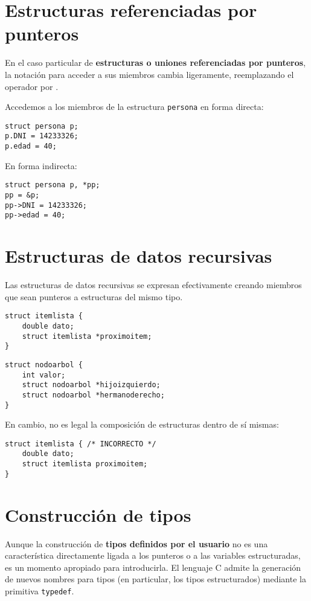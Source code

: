 \section{Estructuras referenciadas por punteros}
En el caso particular de \textbf{estructuras o uniones referenciadas por punteros}, la
notación para acceder a sus miembros cambia ligeramente, reemplazando el
operador  por \quotes{\lstinline{->}}.
\begin{ejemplo}
Accedemos a los miembros de la estructura \lstinline{persona} en forma directa:
\begin{lstlisting}
struct persona p;
p.DNI = 14233326;
p.edad = 40;
\end{lstlisting}
En forma indirecta:
\begin{lstlisting}
struct persona p, *pp;
pp = &p;
pp->DNI = 14233326;
pp->edad = 40;
\end{lstlisting}
\end{ejemplo}


\section{Estructuras de datos recursivas}
Las estructuras de datos recursivas se expresan efectivamente creando miembros que sean punteros a
estructuras del mismo tipo.
\begin{lstlisting}
struct itemlista {
    double dato;
    struct itemlista *proximoitem;
}
\end{lstlisting}

\begin{lstlisting}
struct nodoarbol {
    int valor;
    struct nodoarbol *hijoizquierdo;
    struct nodoarbol *hermanoderecho;
}
\end{lstlisting}

En cambio, no es legal la composición de estructuras dentro de sí mismas:
\begin{lstlisting}
struct itemlista { /* INCORRECTO */
    double dato;
    struct itemlista proximoitem;
}
\end{lstlisting}

\section{Construcción de tipos}
Aunque la construcción de \textbf{tipos definidos por el usuario} no es una
característica directamente ligada a los punteros o a las variables
estructuradas, es un momento apropiado para introducirla. El lenguaje C admite la
generación de nuevos nombres para tipos (en particular, los tipos estructurados) mediante la primitiva
\lstinline{typedef}.

